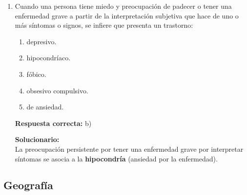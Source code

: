 \begin{enumerate}
	\textbf{Respuesta correcta:} e)
	
	\vspace{2mm}
	\textbf{Solucionario:}\\
	La definición corresponde a \textbf{aprendizaje}: cambio relativamente estable por experiencia.
	
	\item  Cuando una persona tiene miedo y preocupación de padecer o tener una enfermedad grave a partir de la interpretación subjetiva que hace de uno o más síntomas o signos, se infiere que presenta un trastorno:
	\begin{enumerate}[label=\alph*)]
		\item depresivo.
		\item hipocondríaco.
		\item fóbico.
		\item obsesivo compulsivo.
		\item de ansiedad.
	\end{enumerate}
	
	\textbf{Respuesta correcta:} b)
	
	\vspace{2mm}
	\textbf{Solucionario:}\\
	La preocupación persistente por tener una enfermedad grave por interpretar síntomas se asocia a la \textbf{hipocondría} (ansiedad por la enfermedad).
	
	
\end{enumerate}






\subsection*{Geografía}

